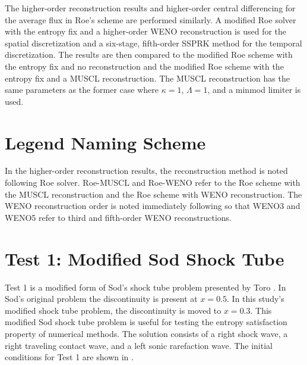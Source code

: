 The higher-order reconstruction results and higher-order central differencing for the average flux in Roe's scheme are performed similarly. A modified Roe solver with the entropy fix and a higher-order WENO reconstruction is used for the spatial discretization and a six-stage, fifth-order SSPRK method for the temporal discretization. The results are then compared to the modified Roe scheme with the entropy fix and no reconstruction and the modified Roe scheme with the entropy fix and a MUSCL reconstruction. The MUSCL reconstruction has the same parameters as the former case where $\kappa = 1$, $\Lambda = 1$, and a minmod limiter is used.
\section{Legend Naming Scheme}
In the higher-order reconstruction results, the reconstruction method is noted following Roe solver. Roe-MUSCL and Roe-WENO refer to the Roe scheme with the MUSCL reconstruction and the Roe scheme with WENO reconstruction. The WENO reconstruction order is noted immediately following so that WENO3 and WENO5 refer to third and fifth-order WENO reconstructions.
\section{Test 1: Modified Sod Shock Tube}
Test 1 is a modified form of Sod's shock tube problem \cite{SOD19781} presented by Toro \cite{toro2013riemann}. In Sod's original problem the discontinuity is present at $x = 0.5$. In this study's modified shock tube problem, the discontinuity is moved to $x = 0.3$. This modified Sod shock tube problem is useful for testing the entropy satisfaction property of numerical methods. The solution consists of a right shock wave, a right traveling contact wave, and a left sonic rarefaction wave. The initial conditions for Test 1 are shown in .


